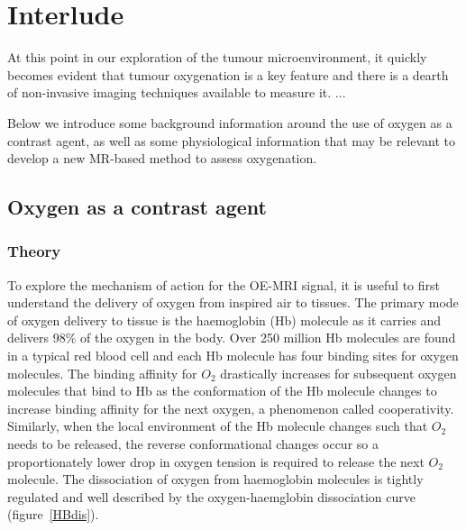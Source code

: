 
\chapter*{Interlude}
\label{ch:interlude}
At this point in our exploration of the tumour microenvironment, it quickly becomes evident that tumour oxygenation is a key feature and there is a dearth of non-invasive imaging techniques available to measure it.
...

Below we introduce some background information around the use of oxygen as a contrast agent, as well as some physiological information that may be relevant to develop a new MR-based method to assess oxygenation.

\section{Oxygen as a contrast agent}

\subsection{Theory}
To explore the mechanism of action for the OE-MRI signal, it is useful to first understand the delivery of oxygen from inspired air to tissues. 
The primary mode of oxygen delivery to tissue is the haemoglobin (Hb) molecule as it carries and delivers 98\% of the oxygen in the body. 
Over 250 million Hb molecules are found in a typical red blood cell and each Hb molecule has four binding sites for oxygen molecules. 
The binding affinity for ${O_2}$ drastically increases for subsequent oxygen molecules that bind to Hb as the conformation of the Hb molecule changes to increase binding affinity for the next oxygen, a phenomenon called cooperativity. 
Similarly, when the local environment of the Hb molecule changes such that ${O_2}$ needs to be released, the reverse conformational changes occur so a proportionately lower drop in oxygen tension is required to release the next ${O_2}$ molecule. 
The dissociation of oxygen from haemoglobin molecules is tightly regulated and well described by the oxygen-haemglobin dissociation curve (figure~\ref{HBdis}).

